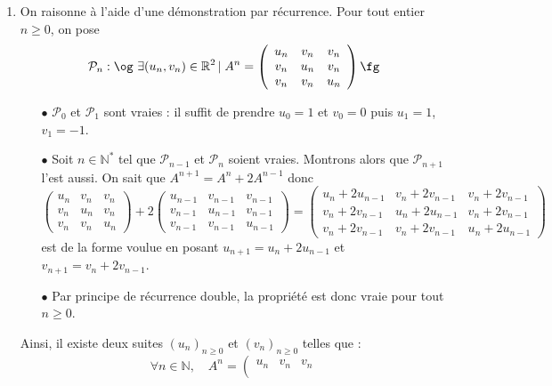 \documentclass[a4paper,twoside,french,10pt]{VcCours}
\begin{document}
\begin{enumerate}
\item On raisonne à l'aide d'une démonstration par récurrence. Pour tout entier $n \geq 0$, on pose $$ \mathcal{P}_n : \hbox{\og} \  \exists (u_n, v_n) \in \mathbb{R}^2 \, \vert \;  A^n  = \left( {\begin{array}{*{20}{c}}
{{u_n}}&{{v_n}}&{{v_n}}\\
{{v_n}}&{{u_n}}&{{v_n}}\\
{{v_n}}&{{v_n}}&{{u_n}}
\end{array}} \right) \hbox{\fg}$$
\begin{enumerate}
\item [$\bullet$] $\mathcal{P}_0$ et $\mathcal{P}_1$ sont vraies : il suffit de prendre $u_0=1$ et $v_0=0$ puis $u_1 = 1$, $v_1=-1$.
\item [$\bullet$] Soit $n \in \mathbb{N}^*$ tel que $\mathcal{P}_{n-1}$ et $\mathcal{P}_n$ soient vraies. Montrons alors que $\mathcal{P}_{n+1}$ l'est aussi. On sait que $A^{n+1} = A^n + 2 A^{n-1}$ donc \[\left( {\begin{array}{*{20}{c}}
{{u_n}}&{{v_n}}&{{v_n}}\\
{{v_n}}&{{u_n}}&{{v_n}}\\
{{v_n}}&{{v_n}}&{{u_n}}
\end{array}} \right) + 2\left( {\begin{array}{*{20}{c}}
{{u_{n - 1}}}&{{v_{n - 1}}}&{{v_{n - 1}}}\\
{{v_{n - 1}}}&{{u_{n - 1}}}&{{v_{n - 1}}}\\
{{v_{n - 1}}}&{{v_{n - 1}}}&{{u_{n - 1}}}
\end{array}} \right) = \left( {\begin{array}{*{20}{c}}
{{u_n} + 2{u_{n - 1}}}&{{v_n} + 2{v_{n - 1}}}&{{v_n} + 2{v_{n - 1}}}\\
{{v_n} + 2{v_{n - 1}}}&{{u_n} + 2{u_{n - 1}}}&{{v_n} + 2{v_{n - 1}}}\\
{{v_n} + 2{v_{n - 1}}}&{{v_n} + 2{v_{n - 1}}}&{{u_n} + 2{u_{n - 1}}}
\end{array}} \right)\]
est de la forme voulue en posant $u_{n+1} = u_n + 2 u_{n-1}$ et $v_{n+1}= v_n + 2 v_{n-1}$.
\item [$\bullet$] Par principe de récurrence double, la propriété est donc vraie pour tout $n \geq 0$.
\end{enumerate}
Ainsi, il existe deux suites $\left(u_{n}\right)_{n \geq 0}$
et $\left(v_{n}\right)_{n \geq 0}$ telles que :
\[
\forall n\in\mathbb{N},\quad A^{n}=\left(\begin{array}{ccc}
u_{n} & v_{n} & v_{n}\\

\end{array}\]
\end{enumerate}
\end{document}
